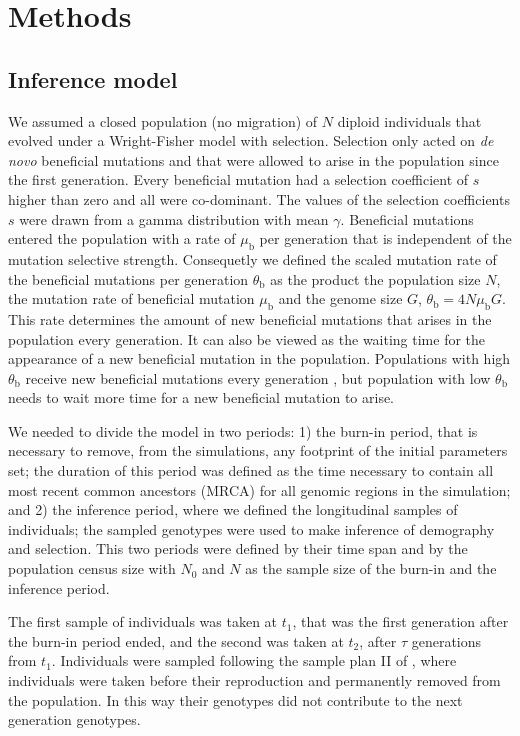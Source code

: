 \documentclass[a4paper, 12pt]{article}
\begin{document}
\section*{Methods}

\subsection*{Inference model}

We assumed a closed population (no migration) of $N$ diploid individuals that evolved under a Wright-Fisher model with selection. Selection only acted on \textit{de novo} beneficial mutations and that were allowed to arise in the population since the first generation. Every beneficial mutation had a selection coefficient of $s$ higher than zero and all were co-dominant. The values of the selection coefficients $s$ were drawn from a gamma distribution with mean $\gamma$. Beneficial mutations entered the population with a rate of $\mu_\mathrm{b}$ per generation that is independent of the mutation selective strength. Consequetly we defined the scaled mutation rate of the beneficial mutations per generation $\theta_\mathrm{b}$ as the product the population size $N$, the mutation rate of beneficial mutation $\mu_\mathrm{b}$ and the genome size $G$, $\theta_\mathrm{b} = 4N\mu_\mathrm{b}G$. This rate determines the amount of new beneficial mutations that arises in the population every generation. It can also be viewed as the waiting time for the appearance of a new beneficial mutation in the population. Populations with high $\theta_\mathrm{b}$ receive new beneficial mutations every generation \citep{Karasov:2010di}, but population with low $\theta_\mathrm{b}$ needs to wait more time for a new beneficial mutation to arise.

We needed to divide the model in two periods: 1) the burn-in period, that is necessary to remove, from the simulations, any footprint of the initial parameters set; the duration of this period was defined as the time necessary to contain all most recent common ancestors (MRCA) for all genomic regions in the simulation; and 2) the inference period, where we defined the longitudinal samples of individuals; the sampled genotypes were used to make inference of demography and selection. This two periods were defined by their time span and by the population census size with $N_\mathrm{0}$ and $N$ as the sample size of the burn-in and the inference period.

The first sample of individuals was taken at $t_1$, that was the first generation after the burn-in period ended, and the second was taken at $t_2$, after  $\tau$ generations from $t_1$. Individuals were sampled following the sample plan II of \citet{Nei:1981vb}, where individuals were taken before their reproduction and permanently removed from the population. In this way their genotypes did not contribute to the next generation genotypes.
\end{document}
